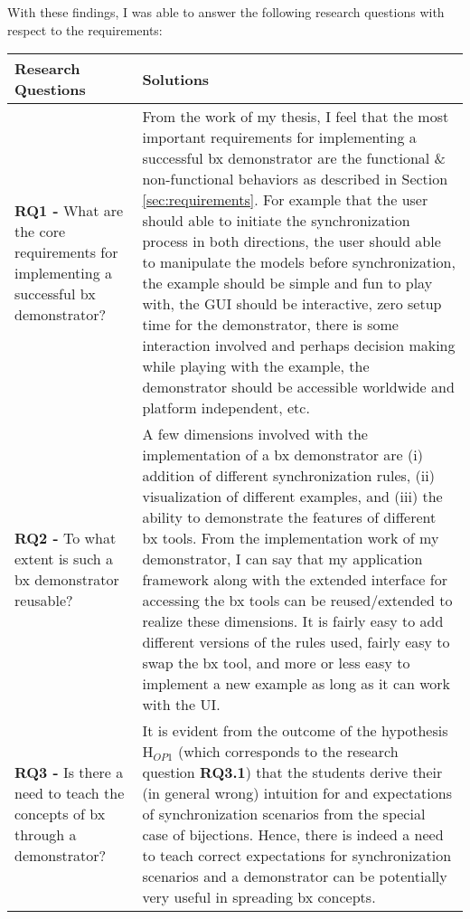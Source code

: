 With these findings, I was able to answer the following research questions with respect to the requirements:
\begin{table}[h]
	\begin{tabular}{|p{5cm}|p{9.5cm}|}
		\hline
		\rowcolor[gray]{.8}	
		\textbf{Research Questions} & \textbf{Solutions}\\
		\hline
		\textbf{RQ1 -} What are the core requirements for implementing a successful bx demonstrator? &
		From the work of my thesis, I feel that the most important requirements for implementing a successful bx demonstrator are the functional \& non-functional behaviors as described in Section \ref{sec:requirements}. For example that the user should able to initiate the synchronization process in both directions, the user should able to manipulate the models before synchronization, the example should be simple and fun to play with, the GUI should be interactive, zero setup time for the demonstrator, there is some interaction involved and perhaps decision making while playing with the example, the demonstrator should be accessible worldwide and platform independent, etc. \\
		\hline
		\textbf{RQ2 -} To what extent is such a bx demonstrator reusable? &
		A few dimensions involved with the implementation of a bx demonstrator are (i) addition of different synchronization rules, (ii) visualization of different examples, and (iii) the ability to demonstrate the features of different bx tools. From the implementation work of my demonstrator, I can say that my application framework along with the extended interface for accessing the bx tools can be reused/extended to realize these dimensions. It is fairly easy to add different versions of the rules used, fairly easy to swap the bx tool, and more or less easy to implement a new example as long as it can work with the UI.\\
		\hline
		\textbf{RQ3 -} Is there a need to teach the concepts of bx through a demonstrator? &
		It is evident from the outcome of the hypothesis H$_{OP1}$ (which corresponds to the research question \textbf{RQ3.1}) that the students derive their (in general wrong) intuition for and expectations of synchronization scenarios from the special case of bijections. Hence, there is indeed a need to teach correct expectations for synchronization scenarios and a demonstrator can be potentially very useful in spreading bx concepts.\\
		\hline				
	\end{tabular}
	\label{tab:Solutions_ResearchQuestions}
\end{table}

